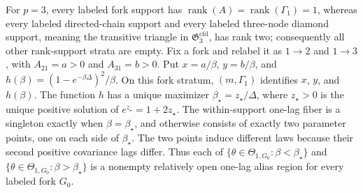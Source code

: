 For \(p=3\), every labeled fork support has \(\operatorname{rank}(A)=\operatorname{rank}(\Gamma_1)=1\), whereas every labeled directed-chain support and every labeled three-node diamond support, meaning the transitive triangle in \(\mathfrak G_3^{\mathrm{cfd}}\), has rank two; consequently all other rank-support strata are empty. Fix a fork and relabel it as \(1\to2\) and \(1\to3\), with \(A_{21}=a>0\) and \(A_{31}=b>0\). Put \(x=a/\beta\), \(y=b/\beta\), and \(h(\beta)=(1-e^{-\beta\Delta})^2/\beta\). On this fork stratum, \((m,\Gamma_1)\) identifies \(x\), \(y\), and \(h(\beta)\). The function \(h\) has a unique maximizer \(\beta_\star=z_\star/\Delta\), where \(z_\star>0\) is the unique positive solution of \(e^{z_\star}=1+2z_\star\). The within-support one-lag fiber is a singleton exactly when \(\beta=\beta_\star\), and otherwise consists of exactly two parameter points, one on each side of \(\beta_\star\). The two points induce different laws because their second positive covariance lags differ. Thus each of \(\{\theta\in\Theta_{1,G_0}:\beta<\beta_\star\}\) and \(\{\theta\in\Theta_{1,G_0}:\beta>\beta_\star\}\) is a nonempty relatively open one-lag alias region for every labeled fork \(G_0\).